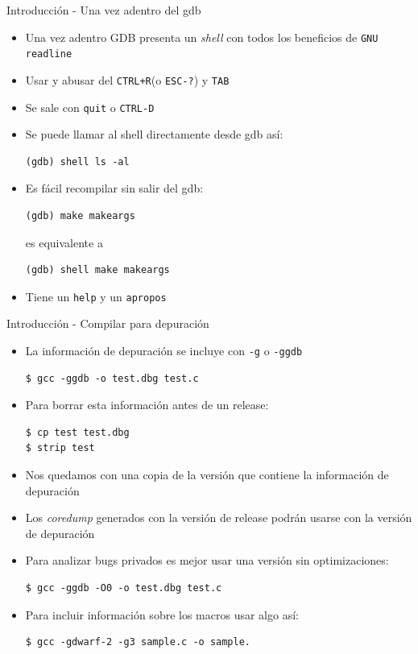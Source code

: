 \documentclass[xetex]{beamer}
\begin{document}
\begin{frame}[fragile]{Introducción - Una vez adentro del gdb}
\begin{itemize}
\item Una vez adentro GDB presenta un {\it shell} con todos los beneficios de \verb=GNU readline=
\item Usar y abusar del \verb=CTRL+R=(o \verb=ESC-?=) y \verb=TAB=
\item Se sale con \verb=quit= o \verb=CTRL-D= 
\item Se puede llamar al shell directamente desde gdb así: 
\begin{verbatim}
(gdb) shell ls -al
\end{verbatim}
\item Es fácil recompilar sin salir del gdb:
\begin{verbatim}
(gdb) make makeargs
\end{verbatim}
es equivalente a 
\begin{verbatim}
(gdb) shell make makeargs
\end{verbatim}
\item Tiene un \verb=help= y un \verb=apropos=
\end{itemize}
\end{frame}


\begin{frame}[fragile]{Introducción - Compilar para depuración}
\begin{itemize}
  \item La información de depuración se incluye con \verb=-g= o \verb=-ggdb=
\begin{verbatim}
$ gcc -ggdb -o test.dbg test.c
\end{verbatim}
  \item Para borrar esta información antes de un release:
\begin{verbatim}
$ cp test test.dbg
$ strip test
\end{verbatim}
  \item Nos quedamos con una copia de la versión que contiene la información de depuración
  \item Los {\it coredump} generados con la versión de release podrán usarse con la versión de depuración
  \item Para analizar bugs privados es mejor usar una versión sin optimizaciones:
\begin{verbatim}
$ gcc -ggdb -O0 -o test.dbg test.c
\end{verbatim}
  \item Para incluir información sobre los macros usar algo así:
\begin{verbatim}
$ gcc -gdwarf-2 -g3 sample.c -o sample. 
\end{verbatim}
\end{itemize}

\end{frame}
\end{document}
